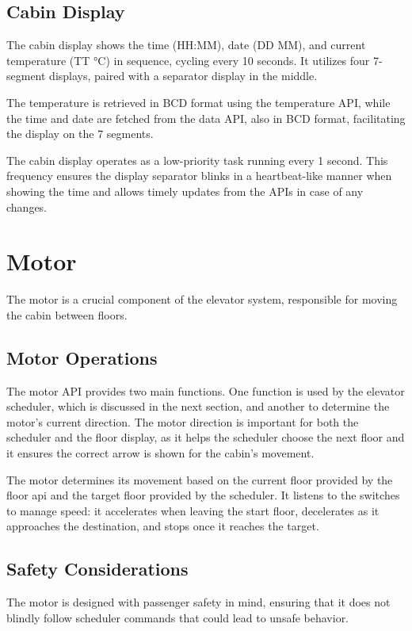 \documentclass[12pt, a4paper]{report}
\begin{document}
\section{Cabin Display}

The cabin display shows the time (HH:MM), date (DD MM), and current temperature (TT °C) in sequence, cycling every 10 seconds. It utilizes four 7-segment displays, paired with a separator display in the middle.

The temperature is retrieved in BCD format using the temperature API, while the time and date are fetched from the data API, also in BCD format, facilitating the display on the 7 segments.

The cabin display operates as a low-priority task running every 1 second. This frequency ensures the display separator blinks in a heartbeat-like manner when showing the time and allows timely updates from the APIs in case of any changes.

\chapter{Motor}

The motor is a crucial component of the elevator system, responsible for moving the cabin between floors.

\section{Motor Operations}

The motor API provides two main functions. One function is used by the elevator scheduler, which is discussed in the next section, and another to determine the motor's current direction. The motor direction is important for both the scheduler and the floor display, as it helps the scheduler choose the next floor and it ensures the correct arrow is shown for the cabin's movement.

The motor determines its movement based on the current floor provided by the floor api and the target floor provided by the scheduler. It listens to the switches to manage speed: it accelerates when leaving the start floor, decelerates as it approaches the destination, and stops once it reaches the target.

\section{Safety Considerations}

The motor is designed with passenger safety in mind, ensuring that it does not blindly follow scheduler commands that could lead to unsafe behavior.
\end{document}
